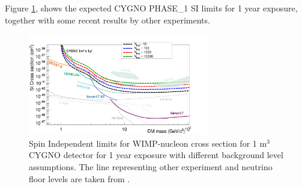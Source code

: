 \documentclass[physics,article,submit,moreauthors,pdftex]{Definitions/mdpi}
\begin{document}
Figure \ref{fig:SI}, shows the expected CYGNO PHASE\_1 SI limits for 1 year exposure, together with some recent results by other experiments.
\begin{figure}[!t]
\centering
 \includegraphics[width=0.7\textwidth]{1m3_1y_4.pdf}
 \caption{Spin Independent limits for WIMP-nucleon cross section for 1 m$^3$ CYGNO detector for 1 year exposure with different background level assumptions. The line representing other experiment and neutrino floor levels are taken from \cite{bib:Aprile_2018,bib:Aprile_2019,bib:B_hm_2019,bib:Agnes_2018,bib:Agnese_2018,bib:Mancuso:2020gnm,bib:Savage_2009}.}
 \label{fig:SI}
 \end{figure}

\end{document}
